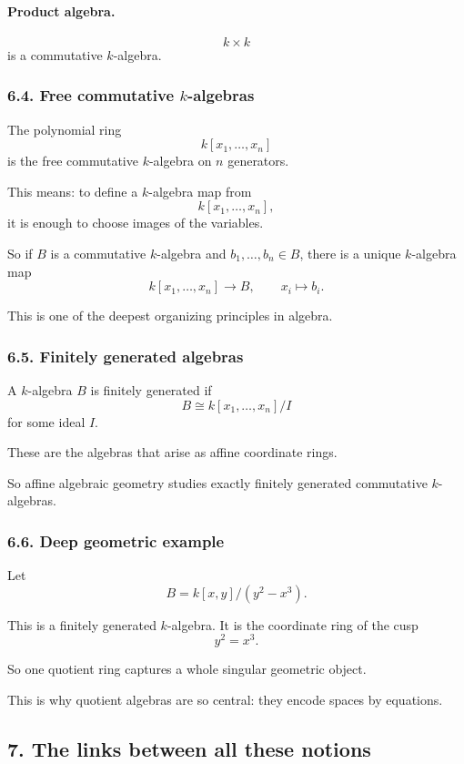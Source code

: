 \documentclass[12pt,a4paper]{article}
\theoremstyle{plain}
\theoremstyle{definition}      %
\begin{document}
	\paragraph{Product algebra.}
	\[
	k\times k
	\]
	is a commutative \(k\)-algebra.
	
	\subsubsection*{6.4. Free commutative \(k\)-algebras}
	
	The polynomial ring
	\[
	k[x_1,\dots,x_n]
	\]
	is the free commutative \(k\)-algebra on \(n\) generators.
	
	This means: to define a \(k\)-algebra map from
	\[
	k[x_1,\dots,x_n],
	\]
	it is enough to choose images of the variables.
	
	So if \(B\) is a commutative \(k\)-algebra and \(b_1,\dots,b_n\in B\), there is a unique \(k\)-algebra map
	\[
	k[x_1,\dots,x_n]\to B,\qquad x_i\mapsto b_i.
	\]
	
	This is one of the deepest organizing principles in algebra.
	
	\subsubsection*{6.5. Finitely generated algebras}
	
	A \(k\)-algebra \(B\) is finitely generated if
	\[
	B\cong k[x_1,\dots,x_n]/I
	\]
	for some ideal \(I\).
	
	These are the algebras that arise as affine coordinate rings.
	
	So affine algebraic geometry studies exactly finitely generated commutative \(k\)-algebras.
	
	\subsubsection*{6.6. Deep geometric example}
	
	Let
	\[
	B=k[x,y]/(y^2-x^3).
	\]
	
	This is a finitely generated \(k\)-algebra.
	It is the coordinate ring of the cusp
	\[
	y^2=x^3.
	\]
	
	So one quotient ring captures a whole singular geometric object.
	
	This is why quotient algebras are so central: they encode spaces by equations.
	
	\subsection*{7. The links between all these notions}
	
\end{document}
